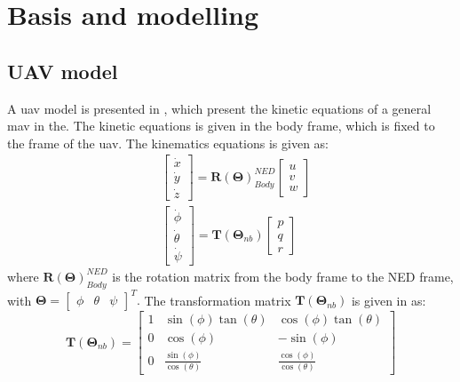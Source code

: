 \chapter{Basis and modelling}
\section{UAV model}
A \gls{uav} model is presented in \citep{beard2012small}, which present the kinetic equations of a general \gls{mav} in the. The kinetic equations is given in the body frame, which is fixed to the frame of the \gls{uav}. The kinematics equations is given as:
\begin{subequations}
\label{eq:kinematics}
\begin{align}\label{eq:kinematicsPosition}
& \begin{bmatrix}
\dot{x} \\
\dot{y} \\
\dot{z}
\end{bmatrix}
=
 \mathbf{R}(\mathbf{\Theta})_{Body}^{NED}\begin{bmatrix}
 u \\
 v \\
 w
 \end{bmatrix} \\
& \begin{bmatrix}
\dot{\phi} \\
\dot{\theta} \\
\dot{\psi}
\end{bmatrix}
= 
\mathbf{T}(\mathbf{\Theta}_{nb})\begin{bmatrix}
p \\
q \\
r
\end{bmatrix}\label{eq:kinematicsAttitude}
\end{align}
\end{subequations}
where $\mathbf{R}(\mathbf{\Theta})_{Body}^{NED}$ is the rotation matrix from the body frame to the NED frame, with $\mathbf{\Theta} = \begin{bmatrix}
\phi & \theta & \psi
\end{bmatrix}^T.$ The transformation matrix $\mathbf{T}(\mathbf{\Theta}_{nb})$ is given in \citep{fossen2011handbook} as:
\begin{equation}
\mathbf{T}(\mathbf{\Theta}_{nb}) = \begin{bmatrix}
1 & \sin(\phi)\tan(\theta) & \cos(\phi)\tan(\theta) \\
0 & \cos(\phi) & -\sin(\phi) \\
0 & \frac{\sin(\phi)}{\cos(\theta)} & \frac{\cos(\phi)}{\cos(\theta)}
\end{bmatrix}
\end{equation}
